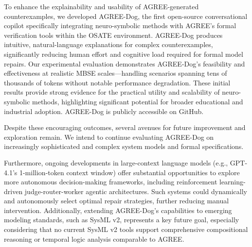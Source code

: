 \label{sec:limitations}


To enhance the explainability and usability of AGREE-generated counterexamples, we developed AGREE-Dog, the first open-source conversational copilot specifically integrating neuro-symbolic methods with AGREE's formal verification tools within the OSATE environment. AGREE-Dog produces intuitive, natural-language explanations for complex counterexamples, significantly reducing human effort and cognitive load required for formal model repairs. Our experimental evaluation demonstrates AGREE-Dog's feasibility and effectiveness at realistic MBSE scales—handling scenarios spanning tens of thousands of tokens without notable performance degradation. These initial results provide strong evidence for the practical utility and scalability of neuro-symbolic methods, highlighting significant potential for broader educational and industrial adoption. AGREE-Dog is publicly accessible on GitHub.%

Despite these encouraging outcomes, several avenues for future improvement and exploration remain. We intend to continue evaluating AGREE-Dog on increasingly sophisticated and complex system models and formal specifications. %

Furthermore, ongoing developments in large-context language models (e.g., GPT-4.1’s 1-million-token context window) offer substantial opportunities to explore more autonomous decision-making frameworks, including reinforcement learning-driven judge-router-worker agentic architectures. Such systems could dynamically and autonomously select optimal repair strategies, further reducing manual intervention. Additionally, extending AGREE-Dog’s capabilities to emerging modeling standards, such as SysML v2, represents a key future goal, especially considering that no current SysML v2 tools support comprehensive compositional reasoning or temporal logic analysis comparable to AGREE.

